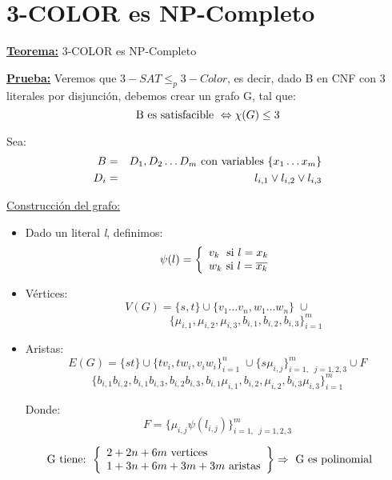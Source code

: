 \documentclass[12pt,a4paper]{report}
\begin{document}
	\section{3-COLOR es NP-Completo}
		\textbf{\underline{Teorema:}} 3-COLOR es NP-Completo

		\textbf{\underline{Prueba:}} Veremos que $3-SAT \leq_{p} 3-Color$, es decir, dado B en CNF con 3 literales por disjunción, debemos crear un grafo G, tal que:
			\[ \textup{B es satisfacible } \Leftrightarrow \chi(G) \leq 3 \]
			\par Sea:
				\begin{eqnarray}
					\nonumber B &=& D_{1}, D_{2} \dotsc D_{m} \textup{ con variables } \lbrace x_{1} \dotsc x_{m} \rbrace \\
					\nonumber D_{i} &=& l_{i, 1} \vee l_{i, 2} \vee l_{i, 3}
				\end{eqnarray}

			\vspace{3mm}
			\underline{Construcción del grafo:}
				\begin{itemize}
					\item Dado un literal \textit{l}, definimos:
						\begin{equation*}
							\psi(l) =
	  					\left \lbrace
			  			\begin{array}{l}
	    				 	v_{k} \; \textup{ si } l = x_{k} \\
	    		 			w_{k} \textup{ si } l = \overline{x_{k}}
			  			\end{array}
	  					\right.
						\end{equation*}
					\item Vértices:
						\[ V(G) = \lbrace s, t \rbrace \cup \lbrace v_{1} \dotsc v_{n}, w_{1} \dotsc w_{n} \rbrace \; \cup \]
						\[ \qquad \qquad \; \; \; \; \lbrace \mu_{i, 1}, \mu_{i, 2}, \mu_{i, 3}, b_{i, 1}, b_{i, 2}, b_{i, 3} \rbrace_{i = 1}^{m}  \]
					\item Aristas:
						\[ E(G) = \lbrace s t \rbrace \cup \lbrace t v_{i}, t w_{i}, v_{i} w_{i} \rbrace_{i = 1}^{n} \; \cup \lbrace s \mu_{i, j} \rbrace_{i = 1, \; \; j = 1, 2, 3}^{m} \cup F \]
						\[ \lbrace b_{i, 1} b_{i, 2}, b_{i, 1} b_{i, 3}, b_{i, 2} b_{i, 3}, b_{i, 1} \mu_{i, 1}, b_{i, 2}, \mu_{i, 2}, b_{i, 3} \mu_{i, 3} \rbrace_{i = 1}^{m}\]
						\par Donde:
						\[ F = \lbrace \mu_{i, j} \psi(l_{i, j}) \rbrace_{i = 1, \; \; j = 1, 2, 3}^{m}\]
				\end{itemize}

				\begin{equation*}
					\textup{ G tiene: }
	  				\left \lbrace
			  		\begin{array}{l}
	    				2 + 2n + 6m \textup{ vertices} \\
	    				1 + 3n + 6m+ 3m + 3m \textup{ aristas}
			  		\end{array}
	  				\right\rbrace
						\Rightarrow \textup{ G es polinomial}
				\end{equation*}
\end{document}
